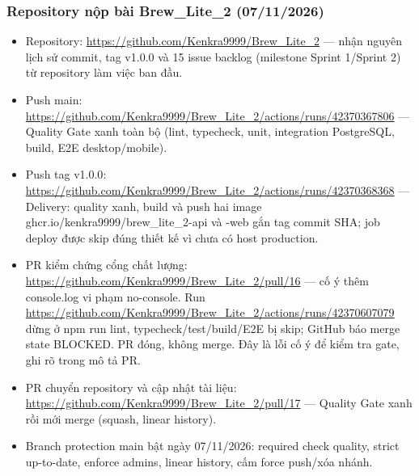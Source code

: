 \documentclass[a4paper,12pt,oneside]{report}
\begin{document}
\subsubsection{Repository nộp bài Brew\_Lite\_2 (07/\allowbreak{}11/\allowbreak{}2026)}
\begin{itemize}
\item Repository: \url{https://github.com/Kenkra9999/Brew_Lite_2} — nhận nguyên lịch sử commit, tag {\small\ttfamily v1.\allowbreak{}0.\allowbreak{}0} và 15 issue backlog (milestone Sprint 1/\allowbreak{}Sprint 2) từ repository làm việc ban đầu.
\item Push {\small\ttfamily main}: \url{https://github.com/Kenkra9999/Brew_Lite_2/actions/runs/42370367806} — Quality Gate xanh toàn bộ (lint, typecheck, unit, integration PostgreSQL, build, E2E desktop/\allowbreak{}mobile).
\item Push tag {\small\ttfamily v1.\allowbreak{}0.\allowbreak{}0}: \url{https://github.com/Kenkra9999/Brew_Lite_2/actions/runs/42370368368} — Delivery: quality xanh, build và push hai image {\small\ttfamily ghcr.\allowbreak{}io/\allowbreak{}kenkra9999/\allowbreak{}brew\_\allowbreak{}lite\_\allowbreak{}2-\allowbreak{}api} và {\small\ttfamily -\allowbreak{}web} gắn tag commit SHA; job deploy được skip đúng thiết kế vì chưa có host production.
\item PR kiểm chứng cổng chất lượng: \url{https://github.com/Kenkra9999/Brew_Lite_2/pull/16} — cố ý thêm {\small\ttfamily console.\allowbreak{}log} vi phạm {\small\ttfamily no-\allowbreak{}console}. Run \url{https://github.com/Kenkra9999/Brew_Lite_2/actions/runs/42370607079} dừng ở {\small\ttfamily npm run lint}, typecheck/\allowbreak{}test/\allowbreak{}build/\allowbreak{}E2E bị skip; GitHub báo merge state {\small\ttfamily BLOCKED}. PR đóng, không merge. Đây là lỗi cố ý để kiểm tra gate, ghi rõ trong mô tả PR.
\item PR chuyển repository và cập nhật tài liệu: \url{https://github.com/Kenkra9999/Brew_Lite_2/pull/17} — Quality Gate xanh rồi mới merge (squash, linear history).
\item Branch protection {\small\ttfamily main} bật ngày 07/\allowbreak{}11/\allowbreak{}2026: required check {\small\ttfamily quality}, strict up-to-date, enforce admins, linear history, cấm force push/\allowbreak{}xóa nhánh.
\end{itemize}
\end{document}
